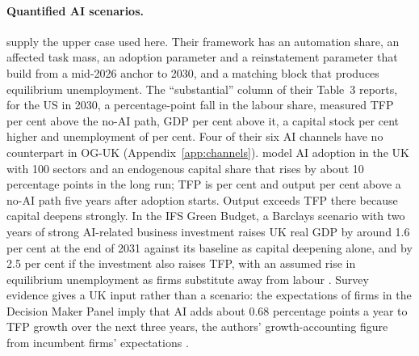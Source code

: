 \paragraph{Quantified AI scenarios.} \citet{korinek2026} supply the upper case used here. Their framework has an automation share, an affected task mass, an adoption parameter and a reinstatement parameter that build from a mid-2026 anchor to 2030, and a matching block that produces equilibrium unemployment. The ``substantial'' column of their Table~3 reports, for the US in 2030, a \genKorinekTableFallPp{} percentage-point fall in the labour share, measured TFP \genKorinekTableTfpPct{} per cent above the no-AI path, GDP \genKorinekTableGdpPct{} per cent above it, a capital stock \genKorinekTableCapitalPct{} per cent higher and unemployment of \genKorinekTableUnemploymentPct{} per cent. Four of their six AI channels have no counterpart in OG-UK (Appendix~\ref{app:channels}). \citet{imf2026sip} model AI adoption in the UK with 100 sectors and an endogenous capital share that rises by about 10 percentage points in the long run; TFP is \genImfTfpYFivePct{} per cent and output \genImfOutputYFivePctTwoDp{} per cent above a no-AI path five years after adoption starts. Output exceeds TFP there because capital deepens strongly. In the IFS Green Budget, a Barclays scenario with two years of strong AI-related business investment raises UK real GDP by around 1.6 per cent at the end of 2031 against its baseline as capital deepening alone, and by 2.5 per cent if the investment also raises TFP, with an assumed rise in equilibrium unemployment as firms substitute away from labour \citep[Section~1.9, Scenario~2]{ifs2026gb}. Survey evidence gives a UK input rather than a scenario: the expectations of firms in the Decision Maker Panel imply that AI adds about 0.68 percentage points a year to TFP growth over the next three years, the authors' growth-accounting figure from incumbent firms' expectations \citep{yotzov2026}.

